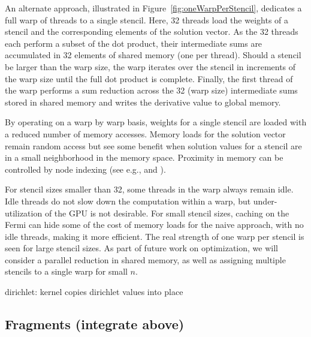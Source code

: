 \documentclass{report}
\begin{document}
An alternate approach, illustrated in Figure~\ref{fig:oneWarpPerStencil}, dedicates a full warp of threads to a single stencil. Here, 32 threads load the weights of a stencil and the corresponding elements of the solution vector. As the 32 threads each perform a subset of the dot product, their intermediate sums are accumulated in 32 elements of shared memory (one per thread).
Should  a stencil be larger than the warp size, the warp iterates over the stencil in increments of the warp size until the full dot product is complete. Finally, the first thread of the warp performs a sum reduction across the 32 (warp size)  intermediate sums stored in shared memory and writes the derivative value to global memory. 

By operating on a warp by warp basis, weights for a single stencil are loaded with a reduced number of memory accesses. Memory loads for the solution vector remain random access but see some benefit when solution values for a stencil are in a small neighborhood in the memory space. Proximity in memory can be controlled by node indexing (see e.g., \cite{Bollig2011} and \cite{Connor2009}). 

For stencil sizes smaller than 32, some threads in the warp always remain idle. Idle threads do not slow down the computation within a warp, but under-utilization of the GPU is not desirable. For small stencil sizes, caching on the Fermi can hide some of the cost of memory loads for the naive approach, with no idle threads, making it more efficient. The real strength of one warp per stencil is seen for large stencil sizes. 
As part of future work on optimization, we will consider a parallel reduction in shared memory, as well as assigning multiple stencils to a single warp for small  $n$. 



dirichlet: kernel copies dirichlet values into place 



\subsection{Fragments (integrate above)}


\end{document}
